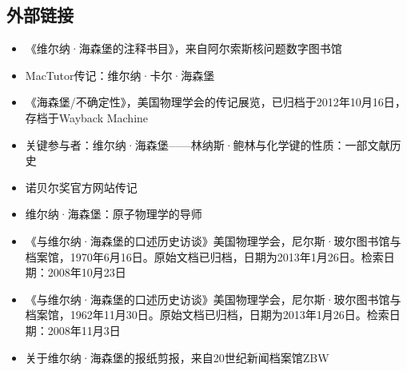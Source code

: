 \subsection{外部链接}
\begin{itemize}
\item 《维尔纳·海森堡的注释书目》，来自阿尔索斯核问题数字图书馆  
\item MacTutor传记：维尔纳·卡尔·海森堡  
\item 《海森堡/不确定性》，美国物理学会的传记展览，已归档于2012年10月16日，存档于Wayback Machine  
\item 关键参与者：维尔纳·海森堡——林纳斯·鲍林与化学键的性质：一部文献历史  
\item 诺贝尔奖官方网站传记  
\item 维尔纳·海森堡：原子物理学的导师  
\item 《与维尔纳·海森堡的口述历史访谈》美国物理学会，尼尔斯·玻尔图书馆与档案馆，1970年6月16日。原始文档已归档，日期为2013年1月26日。检索日期：2008年10月23日  
\item 《与维尔纳·海森堡的口述历史访谈》美国物理学会，尼尔斯·玻尔图书馆与档案馆，1962年11月30日。原始文档已归档，日期为2013年1月26日。检索日期：2008年11月3日  
\item 关于维尔纳·海森堡的报纸剪报，来自20世纪新闻档案馆ZBW
\end{itemize}